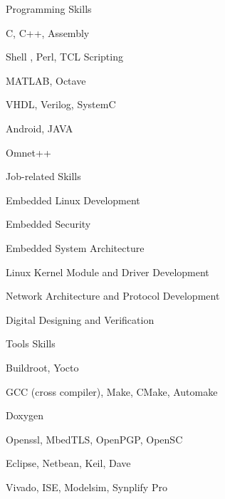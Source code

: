 

\begin{cvskills}

  \cvskill
    {Programming Skills} %
    {\begin{cvitems_3} %
        \item {C, C++, Assembly}
        \item {Shell , Perl, TCL Scripting}
        \item {MATLAB, Octave}
        \item {VHDL, Verilog, SystemC}
        \item {Android, JAVA}
        \item {Omnet++}
      \end{cvitems_3}} %

  \cvskill
    {Job-related Skills} %
    {\begin{cvitems_3} %
        \item {Embedded Linux Development}
        \item {Embedded Security}
        \item {Embedded System Architecture}
        \item {Linux Kernel Module and Driver Development}
        \item {Network Architecture and Protocol Development}
        \item {Digital Designing and Verification}
      \end{cvitems_3}} %
      
  \cvskill
    {Tools Skills} %
    {\begin{cvitems_3} %
        \item {Buildroot, Yocto }
        \item {GCC (cross compiler), Make, CMake, Automake}
        \item {Doxygen}
        \item {Openssl, MbedTLS, OpenPGP, OpenSC}
        \item {Eclipse, Netbean, Keil, Dave}
        \item {Vivado, ISE, Modelsim, Synplify Pro}
      \end{cvitems_3}} %

\end{cvskills}
